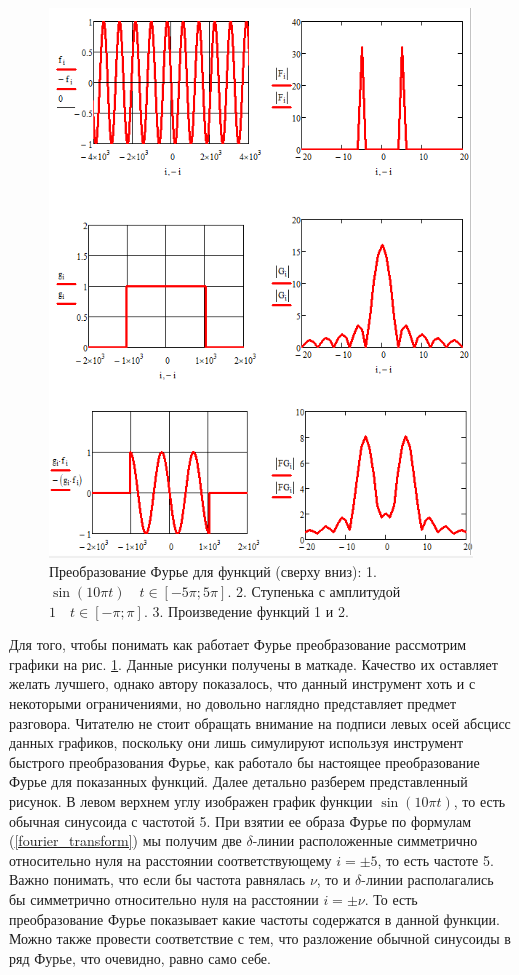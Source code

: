\begin{figure}
    \centering
    \includegraphics[scale = 0.8]{Pictures/Fourier.png}
    \caption{\centering Преобразование Фурье для функций (сверху вниз):
             1. $\sin{\left(10\pi t\right)}\quad t \in [-5\pi; 5\pi]$.
             2. Ступенька с амплитудой $1 \quad t \in [-\pi; \pi]$.
             3. Произведение функций 1 и 2.}
    \label{fig:fourier_example}
\end{figure}
Для того, чтобы понимать как работает Фурье преобразование рассмотрим графики на рис. \ref{fig:fourier_example}. Данные рисунки получены в маткаде. Качество их оставляет желать лучшего, однако автору показалось, что данный инструмент хоть и с некоторыми ограничениями, но довольно наглядно представляет предмет разговора. Читателю не стоит обращать внимание на подписи левых осей абсцисс данных графиков, поскольку они лишь симулируют используя инструмент быстрого преобразования Фурье, как работало бы настоящее преобразование Фурье для показанных функций. Далее детально разберем представленный рисунок. В левом верхнем углу изображен график функции $\sin{(10\pi t)}$, то есть обычная синусоида с частотой 5. При взятии ее образа Фурье по формулам (\ref{fourier_transform}) мы получим две $\delta$-линии расположенные симметрично относительно нуля на расстоянии соответствующему $i=\pm5$, то есть частоте 5. Важно понимать, что если бы частота равнялась $\nu$, то и $\delta$-линии располагались бы симметрично относительно нуля на расстоянии  $i=\pm \nu$. То есть преобразование Фурье показывает какие частоты содержатся в данной функции. Можно также провести соответствие с тем, что разложение обычной синусоиды в ряд Фурье, что очевидно, равно само себе.

